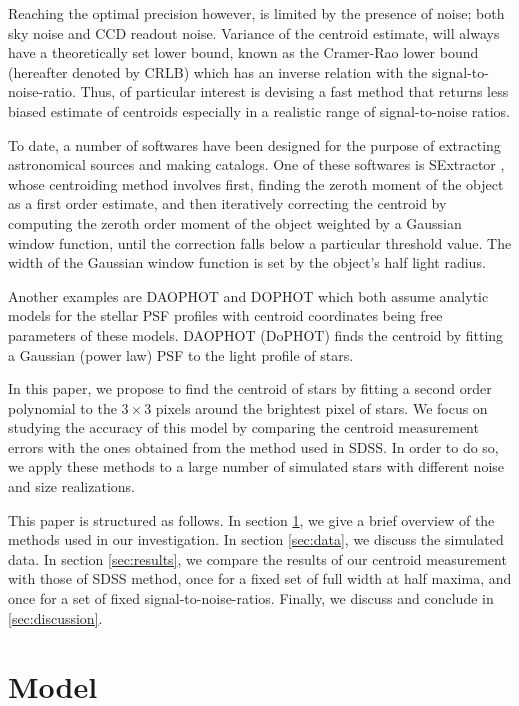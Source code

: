 \documentclass[12pt, preprint]{aastex}
\begin{document}
Reaching the optimal precision however, is limited by the presence of noise; both sky noise and CCD readout noise. Variance of the centroid estimate, will always have a theoretically set lower bound, known as the Cramer-Rao lower bound (hereafter denoted by CRLB) which has an inverse relation with the signal-to-noise-ratio. Thus, of particular interest is devising a fast method that returns less biased estimate of centroids especially in a realistic range of signal-to-noise ratios.       

To date, a number of softwares have been designed for the purpose of extracting astronomical sources and making catalogs. One of these softwares is SExtractor \citep{sex}, whose centroiding method involves first, finding the zeroth moment of the object as a first order estimate, and then iteratively correcting the centroid by computing the zeroth order moment of the object weighted by a Gaussian window function, until the correction falls below a particular threshold value. The width of the Gaussian window function is set by the object's half light radius.

Another examples are DAOPHOT \citep{daophot} and DOPHOT \citep{dophot} which both assume analytic models for the stellar PSF profiles with centroid coordinates being free parameters of these models. DAOPHOT (DoPHOT) finds the centroid by fitting a Gaussian (power law) PSF to the light profile of stars.

In this paper, we propose to find the centroid of stars by fitting a second order polynomial to the $3\times3$ pixels around the brightest pixel of stars. We focus on studying the accuracy of this model by comparing the centroid measurement errors with the ones obtained from the method used in SDSS. In order to do so, we apply these methods to a large number of simulated stars with different noise and size realizations.

This paper is structured as follows. In section \ref{sec:model}, we give a brief overview of the methods used in our investigation. In section \ref{sec:data}, we discuss the simulated data. In section \ref{sec:results}, we compare the results of our centroid measurement with those of SDSS method, once for a fixed set of full width at half maxima, and once for a set of fixed signal-to-noise-ratios. Finally, we discuss and conclude in \ref{sec:discussion}.               

\section{Model}\label{sec:model}
\end{document}
